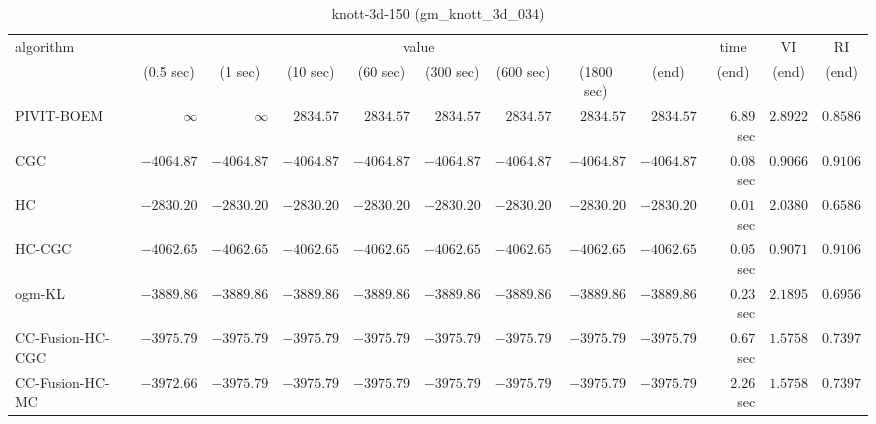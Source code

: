 \begin{table}[H]
\scriptsize
\centering
\caption{knott-3d-150 (gm\_knott\_3d\_034)}
\label{tab:anytimetable-knott-3d-150-gm-knott-3d-034}
\begin{tabular}{lrrrrrrrrrrr}
\toprule
           algorithm &                                   \multicolumn{8}{c}{value} & \multicolumn{1}{c}{time}    & \multicolumn{1}{c}{VI}  & \multicolumn{1}{c}{RI} \\  
\cmidrule(lr){2-9}\cmidrule(lr){10-10} \cmidrule(lr){11-11} \cmidrule(lr){12-12}   
                     & \multicolumn{1}{c}{(0.5 sec)} & \multicolumn{1}{c}{(1 sec)} & \multicolumn{1}{c}{(10 sec)} & \multicolumn{1}{c}{(60 sec)} & \multicolumn{1}{c}{(300 sec)} & \multicolumn{1}{c}{(600 sec)} & \multicolumn{1}{c}{(1800 sec)} & \multicolumn{1}{c}{(end)} & \multicolumn{1}{c}{(end)}    & \multicolumn{1}{c}{(end)}   & \multicolumn{1}{c}{(end)}  \\ \midrule 
          PIVIT-BOEM & $\infty$ & $\infty$ & $      2834.57$ & $      2834.57$ & $      2834.57$ & $      2834.57$ & $      2834.57$ & $      2834.57$ & $         6.89$ sec    & $       2.8922$  & $       0.8586$ \\ 
                 CGC & $     -4064.87$ & $     -4064.87$ & $     -4064.87$ & $     -4064.87$ & $     -4064.87$ & $     -4064.87$ & $     -4064.87$ & $     -4064.87$ & $         0.08$ sec    & $       0.9066$  & $       0.9106$ \\ 
                  HC & $     -2830.20$ & $     -2830.20$ & $     -2830.20$ & $     -2830.20$ & $     -2830.20$ & $     -2830.20$ & $     -2830.20$ & $     -2830.20$ & $         0.01$ sec    & $       2.0380$  & $       0.6586$ \\ 
              HC-CGC & $     -4062.65$ & $     -4062.65$ & $     -4062.65$ & $     -4062.65$ & $     -4062.65$ & $     -4062.65$ & $     -4062.65$ & $     -4062.65$ & $         0.05$ sec    & $       0.9071$  & $       0.9106$ \\ 
              ogm-KL & $     -3889.86$ & $     -3889.86$ & $     -3889.86$ & $     -3889.86$ & $     -3889.86$ & $     -3889.86$ & $     -3889.86$ & $     -3889.86$ & $         0.23$ sec    & $       2.1895$  & $       0.6956$ \\ 
    CC-Fusion-HC-CGC & $     -3975.79$ & $     -3975.79$ & $     -3975.79$ & $     -3975.79$ & $     -3975.79$ & $     -3975.79$ & $     -3975.79$ & $     -3975.79$ & $         0.67$ sec    & $       1.5758$  & $       0.7397$ \\ 
     CC-Fusion-HC-MC & $     -3972.66$ & $     -3975.79$ & $     -3975.79$ & $     -3975.79$ & $     -3975.79$ & $     -3975.79$ & $     -3975.79$ & $     -3975.79$ & $         2.26$ sec    & $       1.5758$  & $       0.7397$ \\ 

\end{tabular}
\end{table}
